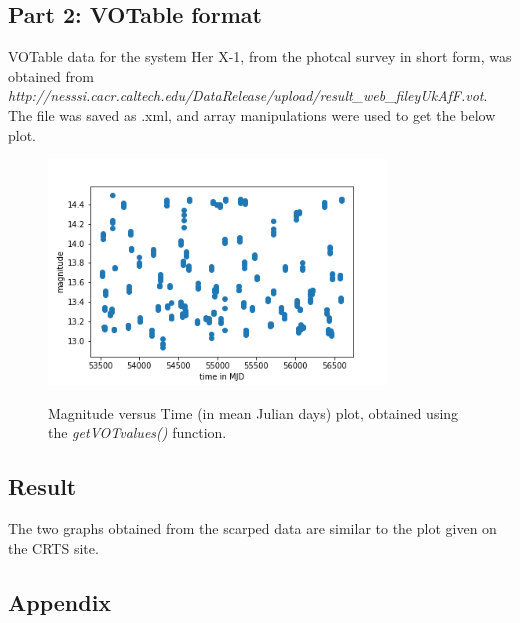 \documentclass{article}
\begin{document}
\subsection*{Part 2: VOTable format}
VOTable data for the system Her X-1, from the photcal survey in short form, was obtained from \textit{http://nesssi.cacr.caltech.edu/DataRelease/upload/result\_web\_fileyUkAfF.vot}. The file was saved as .xml, and array manipulations were used to get the below plot.
\begin{figure}[H]
	\centering
	\includegraphics[width = 0.8\textwidth]{vot.png}
	\label{vot}
	\caption{Magnitude versus Time (in mean Julian days) plot, obtained using the \textit{getVOTvalues()} function.}
\end{figure}
\subsection*{Result}
The two graphs obtained from the scarped data are similar to the plot given on the CRTS site.
\subsection*{Appendix}

\end{document}
